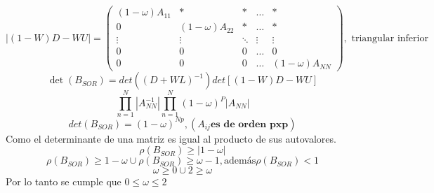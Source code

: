 \begin{itemize}
$$
    |(1-W)D - WU|=\begin{pmatrix}
      (1-\omega)A_{11} &  * & * & \ldots &  * \\
      0 &  (1-\omega)A_{22} & * & \ldots &  * \\
      \vdots & \vdots  & \ddots & \vdots & \vdots \\
      0 & 0  & 0 & \ldots &  0 \\
      0 & 0  & 0 & \ldots &  (1-\omega)A_{N N}
    \end{pmatrix},\text{ triangular inferior}
$$
\[\det(B_{SOR}) = det((D+WL)^{-1})det[(1-W)D - WU]\]
\[\prod_{n=1}^N |A_{NN}^{-1}|\prod_{n=1}^N(1-\omega)^P|A_{NN}|\]
\[det(B_{SOR}) = (1-\omega)^{Np}, (A_{ij} \textbf{es de orden pxp})\]
Como el determinante de una matriz es igual al producto de sus autovalores.
\[\rho(B_{SOR}) \geq |1-\omega|\]
\[\rho(B_{SOR}) \geq 1-\omega \cup \rho(B_{SOR}) \geq \omega - 1, \text{además} \rho(B_{SOR})<1\]
\[\omega \geq 0 \cup 2\geq \omega\]
Por lo tanto se cumple que $0\leq \omega \leq 2$

\end{itemize}

